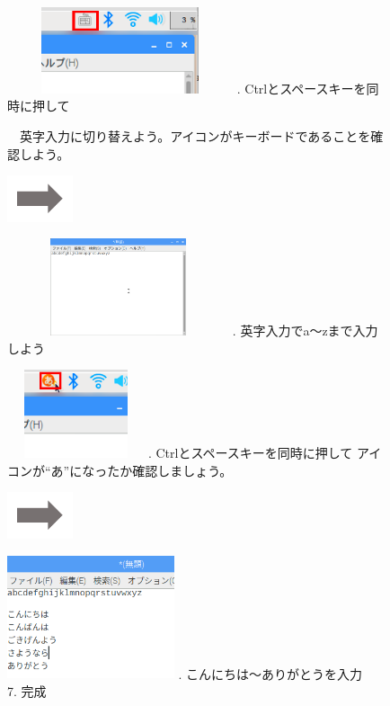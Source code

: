 \documentclass[a4paper,12pt]{jarticle}
\begin{document}
\begin{figure}[ht]
\begin{minipage}{7.238cm}
\includegraphics[width=6.643cm,height=2.533cm]{textbook-img059.png}
. Ctrlとスペースキーを同時に押して　

　英字入力に切り替えよう。アイコンがキーボードであることを確認しよう。
\end{minipage}
\includegraphics[width=1.919cm,height=1.365cm]{textbook-img053.png}
\begin{minipage}{7.351cm}
\includegraphics[width=6.514cm,height=2.856cm]{textbook-img061.png}
. 英字入力でa〜zまで入力しよう
\end{minipage}

\begin{minipage}{6.73cm}
\includegraphics[width=4.029cm,height=2.586cm]{textbook-img062.png}
. Ctrlとスペースキーを同時に押して
アイコンが“あ”になったか確認しましょう。
\end{minipage}
\includegraphics[width=1.919cm,height=1.365cm]{textbook-img053.png}
\begin{minipage}{6.589cm}
\includegraphics[width=4.914cm,height=3.616cm]{textbook-img060.png}
. こんにちは〜ありがとうを入力\\
7. 完成
\end{minipage}




\end{figure}
\end{document}
